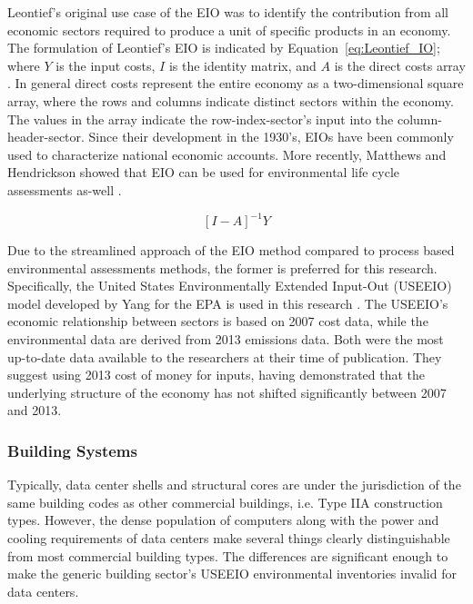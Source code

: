     Leontief's original use case of the EIO was to identify the contribution from all economic sectors required to produce a unit of specific products in an economy.  The formulation of Leontief's EIO is indicated by Equation~\ref{eq:Leontief_IO}; where $Y$ is the input costs, $I$ is the identity matrix, and $A$ is the direct costs array \cite{matthews15}. In general direct costs represent the entire economy as a two-dimensional square array, where the rows and columns indicate distinct sectors within the economy. The values in the array indicate the row-index-sector’s input into the column-header-sector. Since their development in the 1930's, EIOs have been commonly used to characterize national economic accounts. More recently, Matthews and Hendrickson showed that EIO can be used for environmental life cycle assessments as-well \cite{matthews15}.  
    
        \begin{equation} \label{eq:Leontief_IO}
        [I-A]^{-1}Y
        \end{equation}
   
    Due to the streamlined approach of the EIO method compared to process based environmental assessments methods, the former is preferred for this research. Specifically, the United States Environmentally Extended Input-Out (USEEIO) model developed by Yang for the EPA is used in this research \cite{yang17}. The USEEIO’s economic relationship between sectors is based on 2007 cost data, while the environmental data are derived from 2013 emissions data. Both were the most up-to-date data available to the researchers at their time of publication. They suggest using 2013 cost of money for inputs, having demonstrated that the underlying structure of the economy has not shifted significantly between 2007 and 2013. 
    
        \subsubsection{Building Systems}
        Typically, data center shells and structural cores are under the jurisdiction of the same building codes as other commercial buildings, i.e. Type IIA construction types. However, the dense population of computers along with the  power and cooling requirements of data centers make several things clearly distinguishable from most commercial building types. The differences are significant enough to make the generic building sector's USEEIO environmental inventories invalid for data centers. 
        

